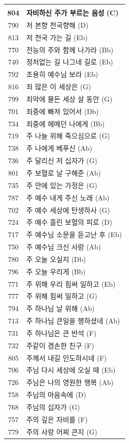 \begin{supertabular}{c l}
 & \\
\textbf{804} & \textbf{자비하신 주가 부르는 음성} \textbf{(C)} \\
790 & 저 본향 천국향해 (D) \\
813 & 저 천국 가는 길 (Eb) \\
770 & 전능의 주와 함께 나가라 (Bb) \\
740 & 정처없는 길 나그네 길로 (Eb) \\
792 & 조용히 예수님 보라 (Eb) \\
816 & 죄 많은 이 세상은 (G) \\
799 & 죄악에 물든 세상 살 동안 (G) \\
701 & 죄중에 빠져 있어서 (Db) \\
734 & 죄중에 헤메던 나에게 (Bb) \\
719 & 주 나늘 위해 죽으심으로 (G) \\
738 & 주 나에게 베푸신 (Ab) \\
736 & 주 달리신 저 십자가 (G) \\
801 & 주 보혈로 날 구해준 (Ab) \\
735 & 주 안에 있는 가정은 (G) \\
787 & 주 예수 내게 주신 노래 (Ab) \\
702 & 주 예수 세상에 탄생하사 (G) \\
724 & 주 예수 흘린 보혈의 피로 (D) \\
717 & 주 예수님 소문을 듣고난 후 (Eb) \\
750 & 주 예수님 크신 사랑 (Ab) \\
780 & 주 오늘 오실지 (Db) \\
796 & 주 오늘 우리게 (Bb) \\
771 & 주 위해 우리 힘써 일하고 (Eb) \\
777 & 주 위해 힘써 일하고 (G) \\
794 & 주 하나님 날 위해 (Ab) \\
713 & 주 하나님 큰일을 행하셨네 (Ab) \\
731 & 주 하나님은 큰 반석 (F) \\
732 & 주같이 겸손한 친구 (F) \\
805 & 주께서 내길 인도하시네 (F) \\
706 & 주님 다시 세상에 오실 때 (Eb) \\
726 & 주님은 나의 영원한 행복 (Ab) \\
758 & 주님의 마음속에 (D) \\
768 & 주님의 십자가 (G) \\
757 & 주의 깊은 자비를 (F) \\
779 & 주의 사랑 어찌 큰지 (G) \\

\end{supertabular}
